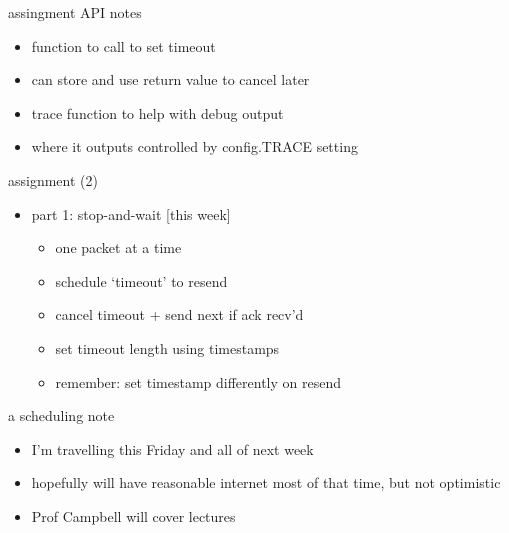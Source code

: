 \begin{frame}{assingment API notes}
    \begin{itemize}
    \item function to call to set timeout
    \item can store and use return value to cancel later
    \vspace{.5cm}
    \item trace function to help with debug output
    \item where it outputs controlled by config.TRACE setting
    \end{itemize}
\end{frame}

\begin{frame}{assignment (2)}
    \begin{itemize}
    \item part 1: stop-and-wait [this week]
        \begin{itemize}
        \item one packet at a time
        \item schedule `timeout' to resend
        \item cancel timeout + send next if ack recv'd
        \item set timeout length using timestamps
        \item remember: set timestamp differently on resend
        \end{itemize}
    \end{itemize}
\end{frame}

\begin{frame}{a scheduling note}
    \begin{itemize}
    \item I'm travelling this Friday and all of next week
    \item hopefully will have reasonable internet most of that time, but not optimistic
    \vspace{.5cm}
    \item Prof Campbell will cover lectures
    \end{itemize}
\end{frame}

